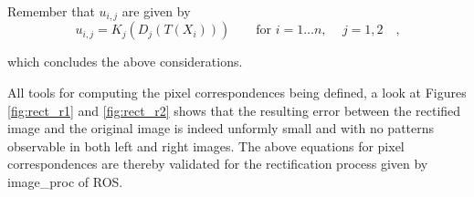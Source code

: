 Remember that $u_{i,j}$ are given by 
\begin{equation}
  u_{i,j} = K_j (D_j(T(X_i))) 
  \hspace{2em} \text{for } i = 1 \ldots n \text{, } \hspace{1em} j = 1,2
  \hspace{1em}\text{,}
  \label{eqn/rect/u_def}
\end{equation}

which concludes the above considerations.

All tools for computing the pixel correspondences being defined, a look at 
Figures \ref{fig:rect_r1} and \ref{fig:rect_r2} shows that the resulting error
between the rectified image and the original image is indeed unformly 
small and with no patterns observable in both left and right images.
The above equations for pixel correspondences are thereby validated for the 
rectification process given by image\_proc of ROS.

